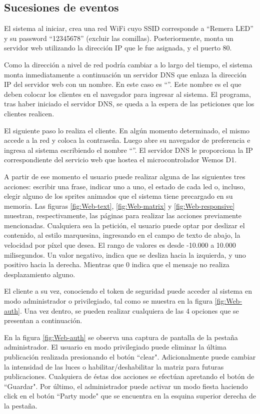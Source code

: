     \subsection{Sucesiones de eventos}
    El sistema al iniciar, crea una red WiFi cuyo SSID corresponde a ``Remera LED'' y su password ``12345678'' (excluir las comillas). Posteriormente, monta un servidor web utilizando la dirección IP que le fue asignada, y el puerto 80. 

    Como la dirección a nivel de red podría cambiar a lo largo del tiempo, el sistema monta inmediatamente a continuación un servidor DNS que enlaza la dirección IP del servidor web con un nombre. En este caso es \enquote{\pagDNS}. Este nombre es el que deben colocar los clientes en el navegador para ingresar al sistema. El programa, tras haber iniciado el servidor DNS, se queda a la espera de las peticiones que los clientes realicen.

    El siguiente paso lo realiza el cliente. En algún momento determinado, el mismo accede a la red y coloca la contraseña. Luego abre su navegador de preferencia e ingresa al sistema escribiendo el nombre \enquote{\pagDNS}. El servidor DNS le proporciona la IP correspondiente del servicio web que hostea el microcontrolador Wemos D1.

    A partir de ese momento el usuario puede realizar alguna de las siguientes tres acciones: escribir una frase, indicar uno a uno, el estado de cada led o, incluso, elegir alguno de los sprites animados que el sistema tiene precargado en su memoria. Las figuras \ref{fig:Web-text}, \ref{fig:Web-matrix} y \ref{fig:Web-responsive} muestran, respectivamente, las páginas para realizar las acciones previamente mencionadas. Cualquiera sea la petición, el usuario puede optar por deslizar el contenido, al estilo marquesina, ingresando en el campo de texto de abajo, la velocidad por píxel que desea. El rango de valores es desde -10.000 a 10.000 milisegundos. Un valor negativo, indica que se desliza hacia la izquierda, y uno positivo hacia la derecha. Mientras que 0 indica que el mensaje no realiza desplazamiento alguno.
    
    El cliente a su vez, conociendo el token de seguridad puede acceder al sistema en modo administrador o privilegiado, tal como se muestra en la figura \ref{fig:Web-auth}. Una vez dentro, se pueden realizar cualquiera de las 4 opciones que se presentan a continuación. 
    
    En la figura \ref{fig:Web-auth} se observa una captura de pantalla de la pestaña administrador. El usuario en modo privilegiado puede eliminar la última publicación realizada presionando el botón ``clear". Adicionalmente puede cambiar la intensidad de las luces o habilitar/deshabilitar la matriz para futuras publicaciones. Cualquiera de éstas dos acciones se efectúan apretando el botón de ``Guardar". Por último, el administrador puede activar un modo fiesta haciendo click en el botón ``Party mode" que se encuentra en la esquina superior derecha de la pestaña.

